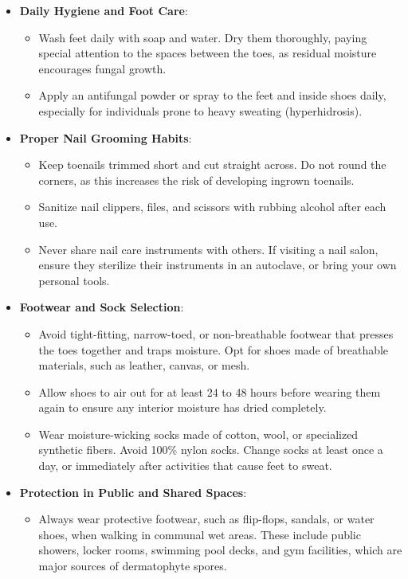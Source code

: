 \begin{itemize}
    \item \textbf{Daily Hygiene and Foot Care}:
    \begin{itemize}
        \item Wash feet daily with soap and water. Dry them thoroughly, paying special attention to the spaces between the toes, as residual moisture encourages fungal growth.
        \item Apply an antifungal powder or spray to the feet and inside shoes daily, especially for individuals prone to heavy sweating (hyperhidrosis).
    \end{itemize}
    \item \textbf{Proper Nail Grooming Habits}:
    \begin{itemize}
        \item Keep toenails trimmed short and cut straight across. Do not round the corners, as this increases the risk of developing ingrown toenails.
        \item Sanitize nail clippers, files, and scissors with rubbing alcohol after each use.
        \item Never share nail care instruments with others. If visiting a nail salon, ensure they sterilize their instruments in an autoclave, or bring your own personal tools.
    \end{itemize}
    \item \textbf{Footwear and Sock Selection}:
    \begin{itemize}
        \item Avoid tight-fitting, narrow-toed, or non-breathable footwear that presses the toes together and traps moisture. Opt for shoes made of breathable materials, such as leather, canvas, or mesh.
        \item Allow shoes to air out for at least 24 to 48 hours before wearing them again to ensure any interior moisture has dried completely.
        \item Wear moisture-wicking socks made of cotton, wool, or specialized synthetic fibers. Avoid 100\% nylon socks. Change socks at least once a day, or immediately after activities that cause feet to sweat.
    \end{itemize}
    \item \textbf{Protection in Public and Shared Spaces}:
    \begin{itemize}
        \item Always wear protective footwear, such as flip-flops, sandals, or water shoes, when walking in communal wet areas. These include public showers, locker rooms, swimming pool decks, and gym facilities, which are major sources of dermatophyte spores.

\end{itemize}
\end{itemize}
